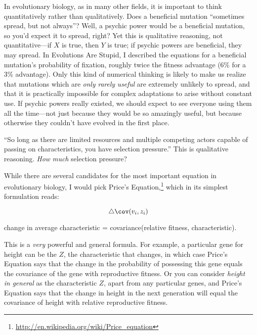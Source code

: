  In evolutionary biology, as in many other fields, it is important
to think quantitatively rather than qualitatively. Does a beneficial
mutation ``sometimes spread, but not
always''? Well, a psychic power would be a beneficial
mutation, so you'd expect it to spread, right? Yet this
is qualitative reasoning, not quantitative---if $X$ is true, then $Y$ is
true; if psychic powers are beneficial, they may spread. In Evolutions
Are Stupid, I described the equations for a beneficial
mutation's probability of fixation, roughly twice the
fitness advantage (6\% for a 3\% advantage). Only this kind of
numerical thinking is likely to make us realize that mutations which
are \textit{only rarely useful} are extremely unlikely to spread, and
that it is practically impossible for complex adaptations to arise
without constant use. If psychic powers really existed, we should
expect to see everyone using them all the time---not just because they
would be so amazingly useful, but because otherwise they
couldn't have evolved in the first place.


 ``So long as there are limited resources and
multiple competing actors capable of passing on characteristics, you
have selection pressure.'' This is qualitative
reasoning. \textit{How much} selection pressure?


 While there are several candidates for the most important equation
in evolutionary biology, I would pick Price's Equation,\footnote{\url{http://en.wikipedia.org/wiki/Price_equation}}
which in its simplest formulation reads:

\begin{equation*}
  \triangle \cov(v_{i}, z_{i})
\end{equation*}


{\centering
 change in average characteristic = covariance(relative fitness,
characteristic).
\par}


\bigskip


 This is a \textit{very} powerful and general formula. For example,
a particular gene for height can be the $Z$, the characteristic that
changes, in which case Price's Equation says that the
change in the probability of possessing this gene equals the covariance
of the gene with reproductive fitness. Or you can consider
\textit{height in general} as the characteristic $Z$, apart from any
particular genes, and Price's Equation says that the
change in height in the next generation will equal the covariance of
height with relative reproductive fitness. 


